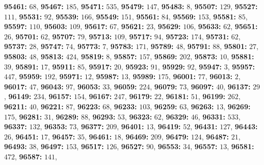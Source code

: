 \textsf{\bfseries 95461:} $68$, \textsf{\bfseries 95467:} $185$, \textsf{\bfseries 95471:} $535$, \textsf{\bfseries 95479:} $147$, \textsf{\bfseries 95483:} $8$, \textsf{\bfseries 95507:} $129$, \textsf{\bfseries 95527:} $111$, \textsf{\bfseries 95531:} $92$, \textsf{\bfseries 95539:} $166$, \textsf{\bfseries 95549:} $151$, \textsf{\bfseries 95561:} $84$, \textsf{\bfseries 95569:} $153$, \textsf{\bfseries 95581:} $85$, \textsf{\bfseries 95597:} $110$, \textsf{\bfseries 95603:} $109$, \textsf{\bfseries 95617:} $67$, \textsf{\bfseries 95621:} $23$, \textsf{\bfseries 95629:} $106$, \textsf{\bfseries 95633:} $62$, \textsf{\bfseries 95651:} $26$, \textsf{\bfseries 95701:} $62$, \textsf{\bfseries 95707:} $79$, \textsf{\bfseries 95713:} $109$, \textsf{\bfseries 95717:} $94$, \textsf{\bfseries 95723:} $174$, \textsf{\bfseries 95731:} $62$, \textsf{\bfseries 95737:} $28$, \textsf{\bfseries 95747:} $74$, \textsf{\bfseries 95773:} $7$, \textsf{\bfseries 95783:} $171$, \textsf{\bfseries 95789:} $48$, \textsf{\bfseries 95791:} $88$, \textsf{\bfseries 95801:} $27$, \textsf{\bfseries 95803:} $48$, \textsf{\bfseries 95813:} $424$, \textsf{\bfseries 95819:} $8$, \textsf{\bfseries 95857:} $157$, \textsf{\bfseries 95869:} $202$, \textsf{\bfseries 95873:} $10$, \textsf{\bfseries 95881:} $39$, \textsf{\bfseries 95891:} $17$, \textsf{\bfseries 95911:} $85$, \textsf{\bfseries 95917:} $20$, \textsf{\bfseries 95923:} $91$, \textsf{\bfseries 95929:} $92$, \textsf{\bfseries 95947:} $3$, \textsf{\bfseries 95957:} $447$, \textsf{\bfseries 95959:} $192$, \textsf{\bfseries 95971:} $12$, \textsf{\bfseries 95987:} $13$, \textsf{\bfseries 95989:} $175$, \textsf{\bfseries 96001:} $77$, \textsf{\bfseries 96013:} $2$, \textsf{\bfseries 96017:} $47$, \textsf{\bfseries 96043:} $97$, \textsf{\bfseries 96053:} $33$, \textsf{\bfseries 96059:} $224$, \textsf{\bfseries 96079:} $73$, \textsf{\bfseries 96097:} $40$, \textsf{\bfseries 96137:} $29$, \textsf{\bfseries 96149:} $234$, \textsf{\bfseries 96157:} $154$, \textsf{\bfseries 96167:} $247$, \textsf{\bfseries 96179:} $22$, \textsf{\bfseries 96181:} $51$, \textsf{\bfseries 96199:} $262$, \textsf{\bfseries 96211:} $40$, \textsf{\bfseries 96221:} $87$, \textsf{\bfseries 96223:} $68$, \textsf{\bfseries 96233:} $103$, \textsf{\bfseries 96259:} $63$, \textsf{\bfseries 96263:} $13$, \textsf{\bfseries 96269:} $175$, \textsf{\bfseries 96281:} $31$, \textsf{\bfseries 96289:} $88$, \textsf{\bfseries 96293:} $53$, \textsf{\bfseries 96323:} $62$, \textsf{\bfseries 96329:} $46$, \textsf{\bfseries 96331:} $533$, \textsf{\bfseries 96337:} $132$, \textsf{\bfseries 96353:} $73$, \textsf{\bfseries 96377:} $209$, \textsf{\bfseries 96401:} $13$, \textsf{\bfseries 96419:} $52$, \textsf{\bfseries 96431:} $127$, \textsf{\bfseries 96443:} $26$, \textsf{\bfseries 96451:} $17$, \textsf{\bfseries 96457:} $35$, \textsf{\bfseries 96461:} $18$, \textsf{\bfseries 96469:} $209$, \textsf{\bfseries 96479:} $124$, \textsf{\bfseries 96487:} $21$, \textsf{\bfseries 96493:} $38$, \textsf{\bfseries 96497:} $153$, \textsf{\bfseries 96517:} $126$, \textsf{\bfseries 96527:} $90$, \textsf{\bfseries 96553:} $34$, \textsf{\bfseries 96557:} $13$, \textsf{\bfseries 96581:} $472$, \textsf{\bfseries 96587:} $141$, 
